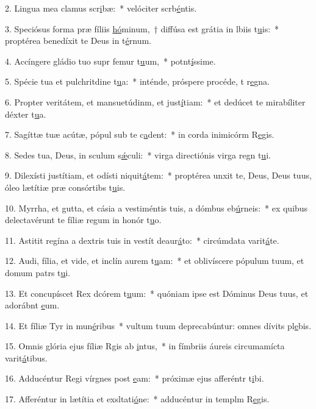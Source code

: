 2. Lingua mea clamus scr\uline{i}bæ:~* velóciter scrb\uline{é}ntis.\par 
3. Speciósus forma præ fíliis \uline{hó}minum,~† diffúsa est grátia in lbiis t\uline{u}is:~* proptérea benedíxit te Deus in t\uline{é}rnum.\par 
4. Accíngere gládio tuo supr femur t\uline{u}um,~* potnt\uline{í}ssime.\par 
5. Spécie tua et pulchritdine t\uline{u}a:~* inténde, próspere procéde, t r\uline{e}gna.\par 
6. Propter veritátem, et mansuetúdinm, et just\uline{í}tiam:~* et dedúcet te mirabíliter déxter t\uline{u}a.\par 
7. Sagíttæ tuæ acútæ, pópul sub te c\uline{a}dent:~* in corda inimicórm R\uline{e}gis.\par 
8. Sedes tua, Deus, in sculum s\uline{ǽ}culi:~* virga directiónis virga regn t\uline{u}i.\par 
9. Dilexísti justítiam, et odísti niquit\uline{á}tem:~* proptérea unxit te, Deus, Deus tuus, óleo lætítiæ præ consórtibs t\uline{u}is.\par 
10. Myrrha, et gutta, et cásia a vestiméntis tuis, a dómbus eb\uline{ú}rneis:~* ex quibus delectavérunt te fíliæ regum in honór t\uline{u}o.\par 
11. Astitit regína a dextris tuis in vestít deaur\uline{á}to:~* circúmdata varit\uline{á}te.\par 
12. Audi, fília, et vide, et inclín aurem t\uline{u}am:~* et oblivíscere pópulum tuum, et domum patrs t\uline{u}i.\par 
13. Et concupíscet Rex dcórem t\uline{u}um:~* quóniam ipse est Dóminus Deus tuus, et adorábnt \uline{e}um.\par 
14. Et fíliæ Tyr in mun\uline{é}ribus~* vultum tuum deprecabúntur: omnes dívits pl\uline{e}bis.\par 
15. Omnis glória ejus fíliæ Rgis ab \uline{i}ntus,~* in fímbriis áureis circumamícta varit\uline{á}tibus.\par 
16. Adducéntur Regi vírgnes post \uline{e}am:~* próximæ ejus afferéntr t\uline{i}bi.\par 
17. Afferéntur in lætítia et exsltati\uline{ó}ne:~* adducéntur in templm R\uline{e}gis.\par 
